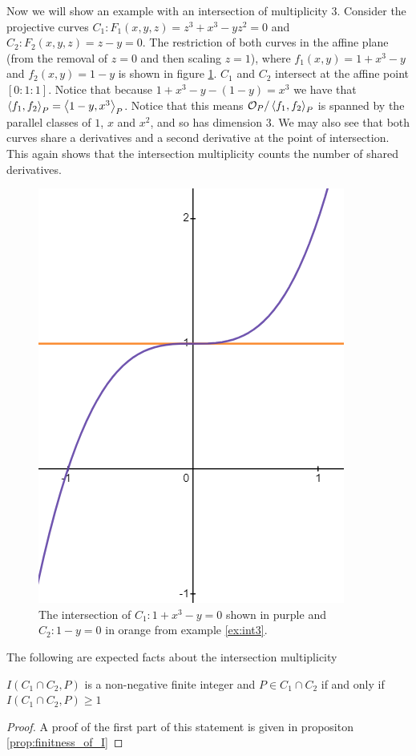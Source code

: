 \begin{example}
\label{ex:int3}
    Now we will show an example with an intersection of multiplicity $3$. Consider the projective curves $C_1:F_1(x,y,z)=z^3+x^3-yz^2=0$ and  $C_2:F_2(x,y,z)=z-y=0$. The restriction of both curves in the affine plane (from the removal of $z=0$ and then scaling $z=1$), where $f_1(x,y)=1+x^3-y$ and $f_2(x,y)=1-y$ is shown in figure \ref{fig:int3}. $C_1$ and $C_2$ intersect at the affine point $[0:1:1]$. 
    Notice that because $1+x^3-y-(1-y)=x^3$ we have that $\left\langle f_1,f_2 \right\rangle_P=\left\langle 1-y,x^3 \right\rangle_P$. Notice that this means $\mathcal{O}_P/\left\langle f_1,f_2 \right\rangle_P$ is spanned by the parallel classes of $1$, $x$ and $x^2$, and so has dimension $3$. We may also see that both curves share a derivatives and a second derivative at the point of intersection. This again shows that the intersection multiplicity counts the number of shared derivatives.
    \begin{figure}
    \centering
    \includegraphics[scale=.5]{pics/graph3.png}
    \caption{The intersection of $C_1:1+x^3-y=0$ shown in purple and $C_2:1-y=0$ in orange from example \ref{ex:int3}.}
    \label{fig:int3}
\end{figure}
\end{example}

The following are expected facts about the intersection multiplicity
\begin{prop}
    $I(C_1\cap C_2,P)$ is a non-negative finite integer and $P\in C_1\cap C_2$ if and only if $I(C_1\cap C_2,P)\geq 1$
\end{prop}
\begin{proof}
    A proof of the first part of this statement is given in propositon \ref{prop:finitness_of_I}
\end{proof}

